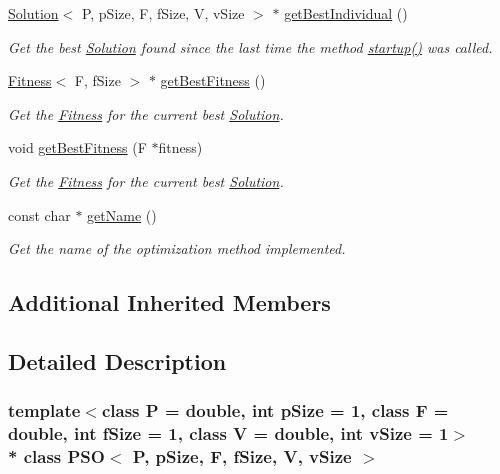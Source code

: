 \begin{DoxyCompactItemize}
\hyperlink{classSolution}{Solution}$<$ P, p\+Size, F, f\+Size, V, v\+Size $>$ $\ast$ \hyperlink{classPSO_ab40ad5efb6079e427abb6e0b699fa018}{get\+Best\+Individual} ()
\begin{DoxyCompactList}\small\item\em Get the best \hyperlink{classSolution}{Solution} found since the last time the method \hyperlink{classPSO_a8fb3e9a46396074cbbdc2d04a83783a5}{startup()} was called. \end{DoxyCompactList}\item 
\hyperlink{structFitness}{Fitness}$<$ F, f\+Size $>$ $\ast$ \hyperlink{classPSO_a1ecbe78cffa328555e3e7428602a67ac}{get\+Best\+Fitness} ()
\begin{DoxyCompactList}\small\item\em Get the \hyperlink{structFitness}{Fitness} for the current best \hyperlink{classSolution}{Solution}. \end{DoxyCompactList}\item 
void \hyperlink{classPSO_a4065a7f2fce1397c85fc9dded16c36da}{get\+Best\+Fitness} (F $\ast$fitness)
\begin{DoxyCompactList}\small\item\em Get the \hyperlink{structFitness}{Fitness} for the current best \hyperlink{classSolution}{Solution}. \end{DoxyCompactList}\item 
const char $\ast$ \hyperlink{classPSO_a62626f6c321722a0b4dcc6c19be102d2}{get\+Name} ()
\begin{DoxyCompactList}\small\item\em Get the name of the optimization method implemented. \end{DoxyCompactList}\end{DoxyCompactItemize}
\subsection*{Additional Inherited Members}


\subsection{Detailed Description}
\subsubsection*{template$<$class P = double, int p\+Size = 1, class F = double, int f\+Size = 1, class V = double, int v\+Size = 1$>$\\*
class P\+S\+O$<$ P, p\+Size, F, f\+Size, V, v\+Size $>$}

